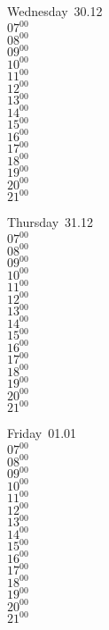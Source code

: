 \documentclass[11pt,a4paper]{book}\usepackage[]{graphicx}\usepackage[]{color}
\begin{document}
\begin{weekdaybox}
  Wednesday~30.12\\
  { 
  \vfill
  $07^{00}$\\
$08^{00}$\\
$09^{00}$\\
$10^{00}$\\
$11^{00}$\\
$12^{00}$\\
$13^{00}$\\
$14^{00}$\\
$15^{00}$\\
$16^{00}$\\
$17^{00}$\\
$18^{00}$\\
$19^{00}$\\
$20^{00}$\\
$21^{00}$\\
  }
\end{weekdaybox}
\clearpage
\begin{headerbox}
\end{headerbox}
\begin{weekdaybox}
  Thursday~31.12\\
  { 
  \vfill
  $07^{00}$\\
$08^{00}$\\
$09^{00}$\\
$10^{00}$\\
$11^{00}$\\
$12^{00}$\\
$13^{00}$\\
$14^{00}$\\
$15^{00}$\\
$16^{00}$\\
$17^{00}$\\
$18^{00}$\\
$19^{00}$\\
$20^{00}$\\
$21^{00}$\\
  }
\end{weekdaybox} 
\begin{weekdaybox}
  Friday~01.01\\
  { 
  \vfill
  $07^{00}$\\
$08^{00}$\\
$09^{00}$\\
$10^{00}$\\
$11^{00}$\\
$12^{00}$\\
$13^{00}$\\
$14^{00}$\\
$15^{00}$\\
$16^{00}$\\
$17^{00}$\\
$18^{00}$\\
$19^{00}$\\
$20^{00}$\\
$21^{00}$\\
  }
\end{weekdaybox}
\end{document}
